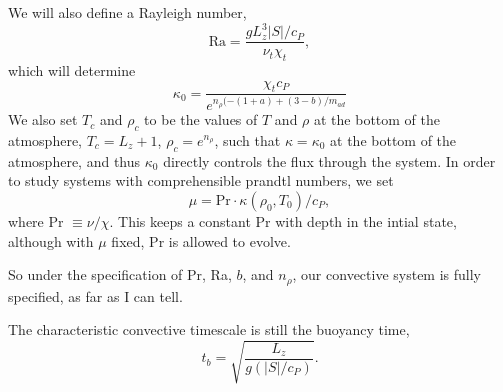 \documentclass[aps, pre, onecolumn, nofootinbib, notitlepage, groupedaddress, amsfonts, amssymb, amsmath, longbibliography]{revtex4-1}
\begin{document}
We will also define a Rayleigh number,
\begin{equation}
\text{Ra} = \frac{g L_z^3 |S|/c_P}{\nu_t \chi_t},
\end{equation}
which will determine
$$
\kappa_0 = \frac{\chi_t c_P}{e^{n_\rho(-(1+a) + (3-b)/m_{ad}}}
$$
We also set $T_c$ and $\rho_c$ to be the values of $T$ and $\rho$ at the
bottom of the atmosphere, $T_c = L_z + 1$, $\rho_c = e^{n_\rho}$, such that
$\kappa = \kappa_0$ at the bottom of the atmosphere, and thus $\kappa_0$ directly
controls the flux through the system. In order to study systems with comprehensible
prandtl numbers, we set
$$
\mu = \text{Pr}\cdot\kappa(\rho_0, T_0)/c_P,
$$
where Pr $\equiv \nu/\chi$. This keeps a constant Pr with depth in the intial state,
although with $\mu$ fixed, Pr is allowed to evolve.

So under the specification of Pr, Ra, $b$, and $n_\rho$, our convective system
is fully specified, as far as I can tell.

The characteristic convective timescale is still the buoyancy time,
$$
t_b = \sqrt{\frac{L_z}{g (|S|/c_P)}}.
$$
\end{document}
